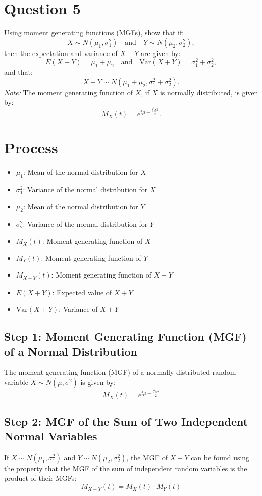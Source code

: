 \documentclass[12pt]{article}
\begin{document}
\newpage
\section*{Question 5}
Using moment generating functions (MGFs), show that if:
\[ X \sim N(\mu_1, \sigma_1^2) \quad \text{and} \quad Y \sim N(\mu_2, \sigma_2^2), \]
then the expectation and variance of \( X+Y \) are given by:
\[ E(X+Y) = \mu_1 + \mu_2 \quad \text{and} \quad \text{Var}(X+Y) = \sigma_1^2 + \sigma_2^2, \]
and that:
\[ X + Y \sim N(\mu_1 + \mu_2, \sigma_1^2 + \sigma_2^2). \]
\textit{Note:} The moment generating function of \( X \), if \( X \) is normally distributed, is given by:
\[ M_X(t) = e^{t\mu + \frac{t^2\sigma^2}{2}}. \]

\section*{Process}
\begin{itemize}
  \item \( \mu_1 \): Mean of the normal distribution for \( X \)
  \item \( \sigma_1^2 \): Variance of the normal distribution for \( X \)
  \item \( \mu_2 \): Mean of the normal distribution for \( Y \)
  \item \( \sigma_2^2 \): Variance of the normal distribution for \( Y \)
  \item \( M_X(t) \): Moment generating function of \( X \)
  \item \( M_Y(t) \): Moment generating function of \( Y \)
  \item \( M_{X+Y}(t) \): Moment generating function of \( X + Y \)
  \item \( E(X+Y) \): Expected value of \( X + Y \)
  \item \( \text{Var}(X+Y) \): Variance of \( X + Y \)
\end{itemize}
\subsection*{Step 1: Moment Generating Function (MGF) of a Normal Distribution}
The moment generating function (MGF) of a normally distributed random variable \( X \sim N(\mu, \sigma^2) \) is given by:
\[ M_X(t) = e^{t\mu + \frac{t^2\sigma^2}{2}} \]

\subsection*{Step 2: MGF of the Sum of Two Independent Normal Variables}
If \( X \sim N(\mu_1, \sigma_1^2) \) and \( Y \sim N(\mu_2, \sigma_2^2) \), the MGF of \( X + Y \) can be found using the property that the MGF of the sum of independent random variables is the product of their MGFs:
\[ M_{X+Y}(t) = M_X(t) \cdot M_Y(t) \]
\end{document}
